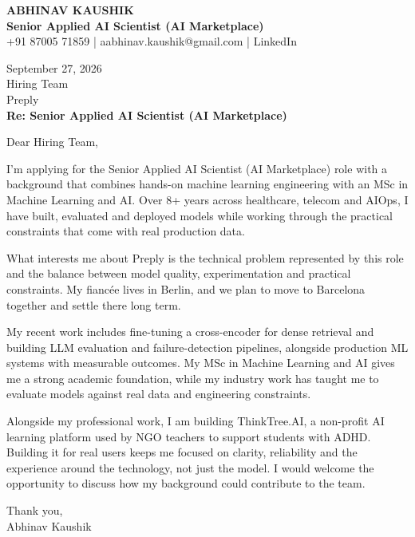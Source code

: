 \documentclass[10pt,a4paper]{article}
\begin{document}
\begin{center}
{\Large\bfseries ABHINAV KAUSHIK}\\[2pt]
{\bfseries Senior Applied AI Scientist (AI Marketplace)}\\[2pt]
+91 87005 71859 \quad | \quad aabhinav.kaushik@gmail.com \quad | \quad LinkedIn
\end{center}
\vspace{8pt}
September 27, 2026\\[6pt]
Hiring Team\\
Preply\\[4pt]
\textbf{Re: Senior Applied AI Scientist (AI Marketplace)}

Dear Hiring Team,

I’m applying for the Senior Applied AI Scientist (AI Marketplace) role with a background that combines hands-on machine learning engineering with an MSc in Machine Learning and AI. Over 8+ years across healthcare, telecom and AIOps, I have built, evaluated and deployed models while working through the practical constraints that come with real production data.

What interests me about Preply is the technical problem represented by this role and the balance between model quality, experimentation and practical constraints. My fiancée lives in Berlin, and we plan to move to Barcelona together and settle there long term.

My recent work includes fine-tuning a cross-encoder for dense retrieval and building LLM evaluation and failure-detection pipelines, alongside production ML systems with measurable outcomes. My MSc in Machine Learning and AI gives me a strong academic foundation, while my industry work has taught me to evaluate models against real data and engineering constraints.

Alongside my professional work, I am building ThinkTree.AI, a non-profit AI learning platform used by NGO teachers to support students with ADHD. Building it for real users keeps me focused on clarity, reliability and the experience around the technology, not just the model. I would welcome the opportunity to discuss how my background could contribute to the team.

Thank you,\\
Abhinav Kaushik
\end{document}
